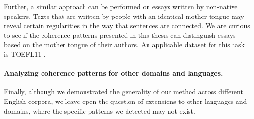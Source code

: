 Further, a similar approach can be performed on essays written by non-native speakers. 
Texts that are written by people with an identical mother tongue may reveal certain regularities in the way that sentences are connected. 
We are curious to see if the coherence patterns presented in this thesis can distinguish essays based on the mother tongue of their authors. 
An applicable dataset for this task is TOEFL11 \cite{blanchard11}. 

\paragraph{Analyzing coherence patterns for other domains and languages.}
Finally, although we demonstrated the generality of our method across different English corpora, we leave open the question of extensions to other languages and domains, where the specific patterns we detected may not exist. 






